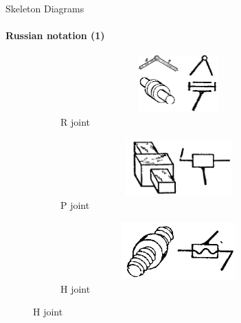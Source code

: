 \documentclass[aspectratio=169]{beamer}
\begin{document}
\begin{frame}[t]{Skeleton Diagrams}
\framesubtitle{Russian notation (1)}
\vspace{-0.5cm}
\begin{figure}[H]
    \begin{subfigure}{0.32\textwidth}
        \centering\includegraphics[height=2.2cm,width=1\textwidth,keepaspectratio]{R_sd.png}
        \caption*{R joint}
    \end{subfigure}
    \begin{subfigure}{0.32\textwidth}
        \centering\includegraphics[height=2.2cm,width=1\textwidth,keepaspectratio]{P_sd.png}
        \caption*{P joint}
    \end{subfigure}
    \begin{subfigure}{0.32\textwidth}
        \centering\includegraphics[height=2.2cm,width=1\textwidth,keepaspectratio]{H_sd.png}
        \caption*{H joint}
    \end{subfigure}


\end{figure}
\end{frame}
\end{document}
